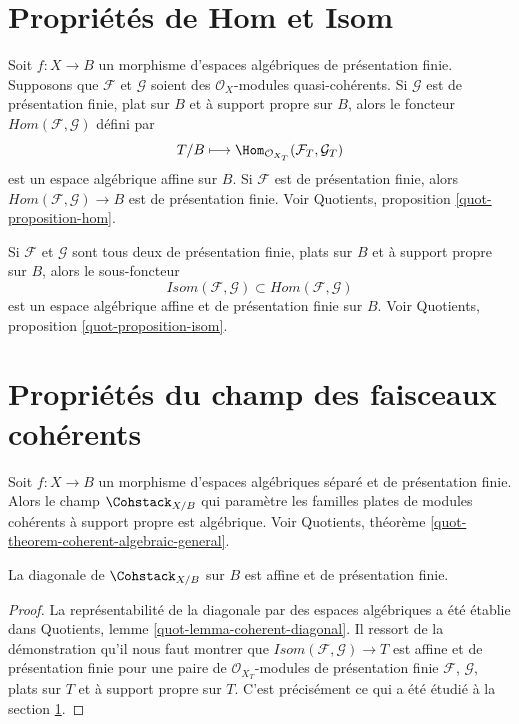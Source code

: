 \section{Propriétés de Hom et Isom}
\label{section-hom-isom}

\noindent
Soit $f : X \to B$ un morphisme d'espaces algébriques de présentation
finie. Supposons que $\mathcal{F}$ et $\mathcal{G}$ soient des
$\mathcal{O}_X$-modules quasi-cohérents.
Si $\mathcal{G}$ est de présentation finie, plat sur $B$ et à support
propre sur $B$, alors le foncteur
$\mathit{Hom}(\mathcal{F}, \mathcal{G})$ défini par
$$
T/B \longmapsto \Hom_{\mathcal{O}_{X_T}}(\mathcal{F}_T, \mathcal{G}_T)
$$
est un espace algébrique affine sur $B$. Si $\mathcal{F}$ est de
présentation finie, alors
$\mathit{Hom}(\mathcal{F}, \mathcal{G}) \to B$
est de présentation finie. Voir Quotients, proposition
\ref{quot-proposition-hom}.

\medskip\noindent
Si $\mathcal{F}$ et $\mathcal{G}$ sont tous deux de présentation finie,
plats sur $B$ et à support propre sur $B$, alors le sous-foncteur
$$
\mathit{Isom}(\mathcal{F}, \mathcal{G}) \subset
\mathit{Hom}(\mathcal{F}, \mathcal{G})
$$
est un espace algébrique affine et de présentation finie sur $B$.
Voir Quotients, proposition \ref{quot-proposition-isom}.




\section{Propriétés du champ des faisceaux cohérents}
\label{section-stack-coherent-sheaves}

\noindent
Soit $f : X \to B$ un morphisme d'espaces algébriques séparé et de
présentation finie. Alors le champ $\Cohstack_{X/B}$ qui paramètre les
familles plates de modules cohérents à support propre est algébrique.
Voir Quotients, théorème
\ref{quot-theorem-coherent-algebraic-general}.

\begin{lemma}
\label{lemma-coherent-diagonal-affine-fp}
La diagonale de $\Cohstack_{X/B}$ sur $B$ est affine et de présentation
finie.
\end{lemma}

\begin{proof}
La représentabilité de la diagonale par des espaces algébriques a été
établie dans Quotients, lemme \ref{quot-lemma-coherent-diagonal}.
Il ressort de la démonstration qu'il nous faut montrer que
$\mathit{Isom}(\mathcal{F}, \mathcal{G}) \to T$
est affine et de présentation finie pour une paire de
$\mathcal{O}_{X_T}$-modules de présentation finie
$\mathcal{F}$, $\mathcal{G}$, plats sur $T$ et à support propre sur $T$.
C'est précisément ce qui a été étudié à la section
\ref{section-hom-isom}.
\end{proof}

